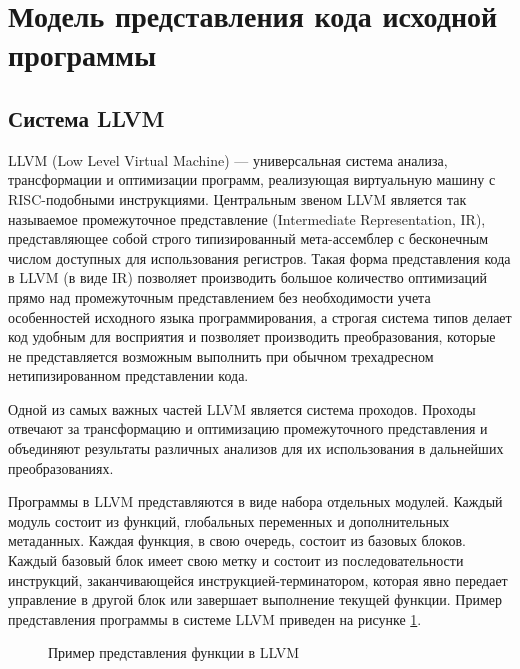 \section{Модель представления кода исходной программы}

\subsection{Система LLVM}
LLVM (Low Level Virtual Machine) --- универсальная система анализа, трансформации и оптимизации программ, реализующая виртуальную машину с RISC-подобными инструкциями. Центральным звеном LLVM является так называемое промежуточное представление (Intermediate Representation, IR), представляющее собой строго типизированный мета-ассемблер с бесконечным числом доступных для использования регистров.  Такая форма представления кода в LLVM (в виде IR) позволяет производить большое количество оптимизаций прямо над промежуточным представлением без необходимости учета особенностей исходного языка программирования, а строгая система типов делает код удобным для восприятия и позволяет производить преобразования, которые не представляется возможным выполнить при обычном трехадресном нетипизированном представлении кода.

Одной из самых важных частей LLVM является система проходов\cite{llvmpass}. Проходы отвечают за трансформацию и оптимизацию промежуточного представления и объединяют результаты различных анализов для их использования в дальнейших преобразованиях.

Программы в LLVM представляются в виде набора отдельных модулей. Каждый модуль состоит из функций, глобальных переменных и дополнительных метаданных. Каждая функция, в свою очередь, состоит из базовых блоков. Каждый базовый блок имеет свою метку и состоит из последовательности инструкций, заканчивающейся инструкцией-терминатором, которая явно передает управление в другой блок или завершает выполнение текущей функции. Пример представления программы в системе LLVM приведен на рисунке \ref{image:llvmIR}.
\begin{figure}[h!]
\caption{Пример представления функции в LLVM}
\label{image:llvmIR}
\end{figure}
	
